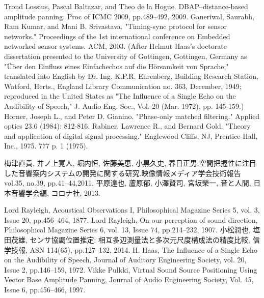 \begin{thebibliography}{99}
      Trond Lossius, Pascal Baltazar, and Theo de la Hogue. DBAP–distance-based amplitude panning. Proc of ICMC 2009, pp.489--492, 2009.
      Ganeriwal, Saurabh, Ram Kumar, and Mani B. Srivastava. "Timing-sync protocol for sensor networks." Proceedings of the 1st international conference on Embedded networked sensor systems. ACM, 2003.
      (After Helmut Haas's doctorate dissertation presented to the University of Gottingen, Gottingen, Germany as "Über den Einfluss eines Einfachechos auf die Hörsamkeit von Sprache;" translated into English by Dr. Ing. K.P.R. Ehrenberg, Building Research Station, Watford, Herts., England Library Communication no. 363, December, 1949; reproduced in the United States as "The Influence of a Single Echo on the Audibility of Speech," J. Audio Eng. Soc., Vol. 20 (Mar. 1972), pp. 145-159.)
       Horner, Joseph L., and Peter D. Gianino. "Phase-only matched filtering." Applied optics 23.6 (1984): 812-816.
  Rabiner, Lawrence R., and Bernard Gold. "Theory and application of digital signal processing." Englewood Cliffs, NJ, Prentice-Hall, Inc., 1975. 777 p. 1 (1975).

   梅津直貴, 井ノ上寛人, 堀内恒, 佐藤美恵, 小黒久史, 春日正男.空間把握性に注目した音響案内システムの開発に関する研究.映像情報メディア学会技術報告 vol.35, no.39, pp.41--44,2011.
     平原達也, 蘆原郁, 小澤賢司, 宮坂榮一, 音と人間, 日本音響学会編, コロナ社, 2013.


Lord Rayleigh, Acoustical Observations I,
Philosophical Magazine Series 5, vol. 3, Issue 20, pp.456--464, 1877.
Lord Rayleigh, On our perception of sound direction,
Philosophical Magazine Series 6, vol. 13, Issue 74, pp.214--232, 1907.
小松潤也, 塩田茂雄, センサ協調位置推定: 相互多辺測量法と多次元尺度構成法の精度比較, 信学技報, ASN 114(65), pp.127--132, 2014.
H. Haas, The Influence of a Single Echo on the Audibility of Speech,
Journal of Auditory Engineering Society, vol. 20, Issue 2, pp.146--159, 1972.
Vikke Pulkki, Virtual Sound Source Positioning Using Vector Base Amplitude Panning, Journal of Audio Engineering Society, Vol. 45, Issue 6, pp.456--466, 1997.


\end{thebibliography}
